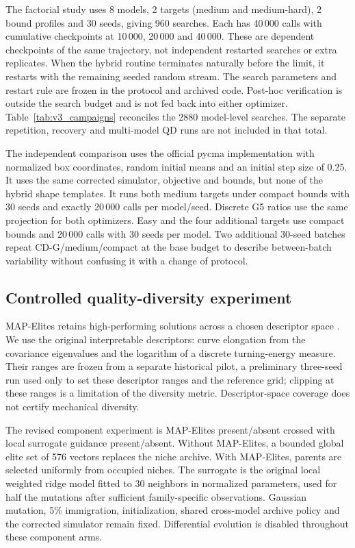 \documentclass[applsci,article,submit,pdftex,moreauthors]{Definitions/mdpi}
\begin{document}
The factorial study uses 8 models, 2 targets (medium and medium-hard), 2 bound profiles and 30 seeds, giving 960 searches. Each has 40\,000 calls with cumulative checkpoints at 10\,000, 20\,000 and 40\,000. These are dependent checkpoints of the same trajectory, not independent restarted searches or extra replicates. When the hybrid routine terminates naturally before the limit, it restarts with the remaining seeded random stream. The search parameters and restart rule are frozen in the protocol and archived code. Post-hoc verification is outside the search budget and is not fed back into either optimizer.
Table~\ref{tab:v3_campaigns} reconciles the 2880 model-level searches. The separate repetition, recovery and multi-model QD runs are not included in that total.


The independent comparison uses the official pycma implementation \cite{HansenCMA} with normalized box coordinates, random initial means and an initial step size of 0.25. It uses the same corrected simulator, objective and bounds, but none of the hybrid shape templates. It runs both medium targets under compact bounds with 30 seeds and exactly 20\,000 calls per model/seed. Discrete G5 ratios use the same projection for both optimizers. Easy and the four additional targets use compact bounds and 20\,000 calls with 30 seeds per model. Two additional 30-seed batches repeat CD-G/medium/compact at the base budget to describe between-batch variability without confusing it with a change of protocol.

\subsection{Controlled quality-diversity experiment}\label{sec:qd}
MAP-Elites retains high-performing solutions across a chosen descriptor space \cite{Mouret2015,Pugh2016}. We use the original interpretable descriptors: curve elongation from the covariance eigenvalues and the logarithm of a discrete turning-energy measure. Their ranges are frozen from a separate historical pilot, a preliminary three-seed run used only to set these descriptor ranges and the reference grid; clipping at these ranges is a limitation of the diversity metric. Descriptor-space coverage does not certify mechanical diversity.

The revised component experiment is MAP-Elites present/absent crossed with local surrogate guidance present/absent. Without MAP-Elites, a bounded global elite set of 576 vectors replaces the niche archive. With MAP-Elites, parents are selected uniformly from occupied niches. The surrogate is the original local weighted ridge model fitted to 30 neighbors in normalized parameters, used for half the mutations after sufficient family-specific observations. Gaussian mutation, 5\% immigration, initialization, shared cross-model archive policy and the corrected simulator remain fixed. Differential evolution is disabled throughout these component arms.
\end{document}
